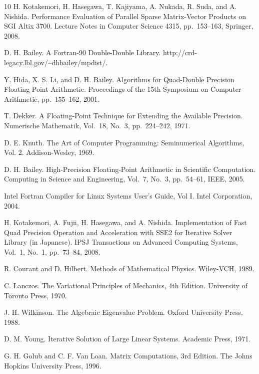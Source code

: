 \documentclass[a4paper]{jarticle}
\begin{document}
{{\begin{thebibliography}{10}
H. Kotakemori, H. Hasegawa, T. Kajiyama, A. Nukada, R. Suda, and A. Nishida.
\newblock Performance Evaluation of Parallel Sparse Matrix-Vector Products on SGI Altix 3700.
\newblock Lecture Notes in Computer Science 4315, pp.\ 153--163, Springer, 2008.

D. H. Bailey.
\newblock A Fortran-90 Double-Double Library.
\newblock http://crd-legacy.lbl.gov/\textasciitilde dhbailey/mpdist/.

Y. Hida, X. S. Li, and D. H. Bailey.
\newblock Algorithms for Quad-Double Precision Floating Point Arithmetic.
\newblock Proceedings of the 15th Symposium on Computer Arithmetic, pp.\ 155--162, 2001.

T. Dekker.
\newblock A Floating-Point Technique for Extending the Available Precision.
\newblock Numerische Mathematik, Vol.~18, No.~3, pp.\ 224--242, 1971.

D. E. Knuth. 
The Art of Computer Programming: Seminumerical Algorithms, Vol. 2.
Addison-Wesley, 1969.

D. H. Bailey.
\newblock High-Precision Floating-Point Arithmetic in Scientific Computation.
\newblock Computing in Science and Engineering, Vol.~7, No.~3, pp.\ 54--61, IEEE, 2005.

\newblock Intel Fortran Compiler for Linux Systems User's Guide, Vol I.
\newblock Intel Corporation, 2004.

H. Kotakemori, A. Fujii, H. Hasegawa, and A. Nishida.
\newblock Implementation of Fast Quad Precision Operation and
	Acceleration with SSE2 for Iterative Solver Library (in
	Japanese).
\newblock IPSJ Transactions on Advanced Computing Systems,  Vol.~1, No.~1, pp.\ 73--84, 2008.

R. Courant and D. Hilbert.
\newblock Methods of Mathematical Physics. 
\newblock Wiley-VCH, 1989.

C. Lanczos. 
\newblock The Variational Principles of Mechanics, 4th Edition. 
\newblock University of Toronto Press, 1970.

J. H. Wilkinson. 
\newblock The Algebraic Eigenvalue Problem. 
\newblock Oxford University Press, 1988.

D. M. Young. 
\newblock Iterative Solution of Large Linear Systems. 
\newblock Academic Press, 1971.

G. H. Golub and C. F. Van Loan.
\newblock Matrix Computations, 3rd Edition.
\newblock The Johns Hopkins University Press, 1996.


\end{thebibliography}}}
\end{document}
